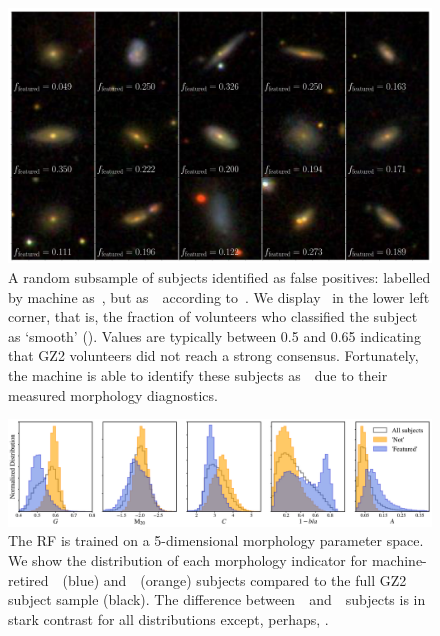 \begin{figure}
\centering
\includegraphics[width=\textwidth]{Figures/human_machine/f9.pdf}
\caption[Random subsample of galaxy jpegs identified as false positives by the Random Forest]{A random subsample of subjects identified as false positives: labelled by machine as~\feat, but as~\notfeat~according to~\raw. We display \fsmooth~in the lower left corner, that is, the fraction of volunteers who classified the subject as `smooth' (\notfeat). Values are typically between 0.5 and 0.65 indicating that GZ2 volunteers did not reach a strong consensus. Fortunately, the machine is able to identify these subjects as~\feat~due to their measured morphology diagnostics. \label{fig: machine false pos}}
\end{figure}


\begin{figure}
\centering
\includegraphics[width=\textwidth]{Figures/human_machine/morph_params_raw_labels_4paper.pdf}
\caption[Distributions of measured galaxy morphology features.]{The RF is trained on a 5-dimensional morphology parameter space. We show the distribution of each morphology indicator for machine-retired~\feat~(blue) and~\notfeat~(orange) subjects compared to the full GZ2 subject sample (black). The difference between~\feat~and~\notfeat~subjects is in stark contrast for all distributions except, perhaps, .  \label{fig: morph params}}
\end{figure}

